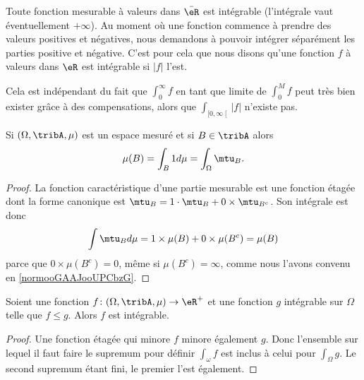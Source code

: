 \begin{remark}
    Toute fonction mesurable à valeurs dans \( \bar \eR\) est intégrable (l'intégrale vaut éventuellement \( +\infty\)). Au moment où une fonction commence à prendre des valeurs positives et négatives, nous demandons à pouvoir intégrer séparément les parties positive et négative. C'est pour cela que nous disons qu'une fonction \( f\) à valeurs dans \( \eR\) est intégrable si \( | f |\) l'est.

    Cela est indépendant du fait que \( \int_0^{\infty}f\) en tant que limite de \( \int_0^{M}f\) peut très bien exister grâce à des compensations, alors que \( \int_{\mathopen[ 0 , \infty \mathclose[}| f |\) n'existe pas.
\end{remark}

\begin{lemma}       \label{LemooPJLNooVKrBhN}
    Si \( (\Omega,\tribA,\mu)\) est un espace mesuré et si \( B\in \tribA\) alors
    \begin{equation}
        \mu(B)=\int_B1d\mu=\int_{\Omega}\mtu_B.
    \end{equation}
\end{lemma}

\begin{proof}
    La fonction caractéristique d'une partie mesurable est une fonction étagée dont la forme canonique est \( \mtu_B=1\cdot \mtu_B+0\times \mtu_{B^c}\). Son intégrale est donc
    \begin{equation}
        \int\mtu_Bd\mu=1\times \mu(B)+0\times \mu(B^c)=\mu(B)
    \end{equation}
    parce que \( 0\times \mu(B^c)=0\), même si \( \mu(B^c)=\infty\), comme nous l'avons convenu en \ref{normooGAAJooUPCbzG}.
\end{proof}

\begin{proposition}      \label{PROPooGTMVooPHcrRl}
    Soient une fonction \( f\colon (\Omega,\tribA,\mu)\to \eR^+\) et une fonction \( g\) intégrable sur \( \Omega\) telle que \( f\leq g\). Alors \( f\) est intégrable.
\end{proposition}

\begin{proof}
    Une fonction étagée qui minore \( f\) minore également \( g\). Donc l'ensemble sur lequel il faut faire le supremum pour définir \( \int_{\omega}f\) est inclus à celui pour \( \int_{\Omega}g\). Le second supremum étant fini, le premier l'est également.
\end{proof}

